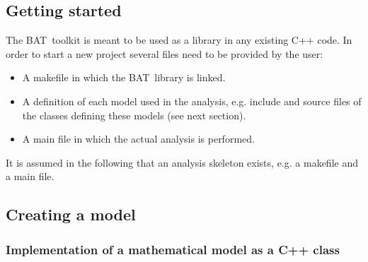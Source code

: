 \documentclass[11pt, a4paper]{article}
\newcommand{\BAT}{{\sc BAT}}
\begin{document}

\subsection{Getting started} 

The \BAT\ toolkit is meant to be used as a library in any existing C++
code. In order to start a new project several files need to be
provided by the user:
% 
\begin{itemize}
\item A makefile in which the \BAT\ library is linked. 
\item A definition of each model used in the analysis, e.g. include 
      and source files of the classes defining these models (see 
      next section).  
\item A main file in which the actual analysis is performed. 
\end{itemize} 

\noindent  
It is assumed in the following that an analysis skeleton exists, e.g. a 
makefile and a main file. 


\subsection{Creating a model} 

\subsubsection{Implementation of a mathematical model as a C++ class} 
\end{document}
